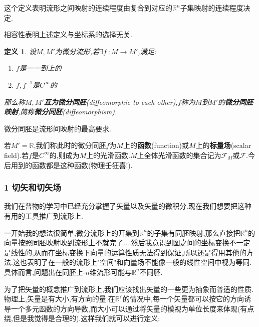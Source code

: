 \documentclass[UTF8]{article}
\begin{document}
	这个定义表明流形之间映射的连续程度由复合到对应的$\mathbb{R}^n$子集映射的连续程度决定.
	
	相容性表明上述定义与坐标系的选择无关.
	
	\newtheorem*{diffeomorphicToEachOther}{定义}
	
	\begin{diffeomorphicToEachOther}
		
		设$M,M'$为微分流形,若$\exists f~: M \to M'$,满足:
		
		\begin{enumerate}
			
			\item $f$是一一到上的
			
			\item $f,f^{-1}$是$C^{\infty}$的
			
		\end{enumerate}
		
		那么称$M,M'$\textbf{互为微分同胚}(diffeomorphic to each other),$f$称为$M$到$M'$的\textbf{微分同胚映射},简称\textbf{微分同胚}(diffeomorphism).
		
	\end{diffeomorphicToEachOther}
	
	微分同胚是流形间映射的最高要求.
	
	若$M' = \mathbb{R}$,我们称此时的微分同胚$f$为$M$上的\textbf{函数}(function)或$M$上的\textbf{标量场}(scalar field).若$f$是$C^{\infty}$的,则成为$M$上的光滑函数.$M$上全体光滑函数的集合记为$\mathscr{F}_{M}$或$\mathscr{F}$.今后用到的函数都是这种函数(物理壬狂喜!).
	
	
	
	
	
	\newpage
	
\subsubsection*{1 切矢和切矢场}
	
	我们在普物的学习中已经充分掌握了矢量以及矢量的微积分.现在我们想要把这种有用的工具推广到流形上.
	
	一开始我的想法很简单,微分流形上的开集到$\mathbb{R}^n$的子集有同胚映射,那么直接把$\mathbb{R}^n$的向量按照同胚映射映到流形上不就完了....然后我意识到图之间的坐标变换不一定是线性的,从而在坐标变换下向量的运算性质无法得到保证,所以还是得用其他的方法.这也表明了在一般的流形上"空间"和向量场不能像一般的线性空间中视为等同.具体而言,问题出在同胚上-$n$维流形可能与$\mathbb{R}^n$不同胚.
	
	为了把矢量的概念推广到流形上,我们应该找出矢量的一些更为抽象而普适的性质.物理上,矢量是有大小,有方向的量.在$\mathbb{R^n}$的情况中,每一个矢量都可以按它的方向诱导一个多元函数的方向导数,而大小可以通过将矢量的模视为单位长度来体现(有点绕,但是我觉得是合理的).这样我们就可以进行定义:
	
\end{document}
